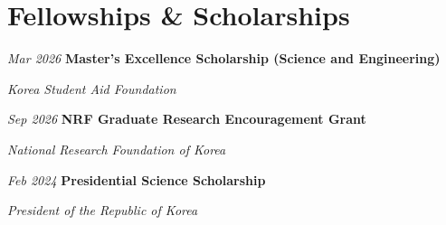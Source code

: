 \section{Fellowships \& Scholarships}

\begin{twocolentry}{\textit{Mar 2026}}
    \textbf{Master's Excellence Scholarship (Science and Engineering)}
    \par\textit{Korea Student Aid Foundation}
\end{twocolentry}

\vspace{0.05cm}

\begin{twocolentry}{\textit{Sep 2026}}
    \textbf{NRF Graduate Research Encouragement Grant}
    \par\textit{National Research Foundation of Korea}
\end{twocolentry}

\vspace{0.05cm}

\begin{twocolentry}{\textit{Feb 2024}}
    \textbf{Presidential Science Scholarship}
    \par\textit{President of the Republic of Korea}
\end{twocolentry}
